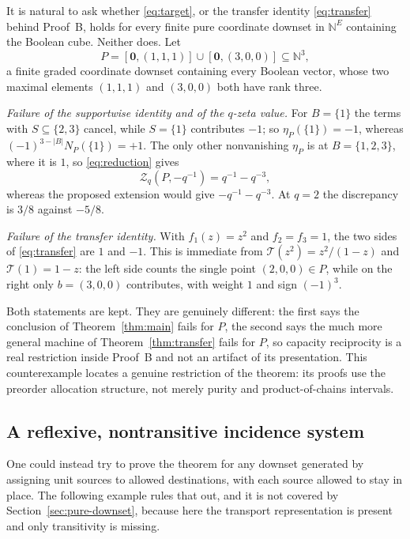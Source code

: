 \documentclass[11pt]{article}
\numberwithin{equation}{section}
\theoremstyle{definition}
\theoremstyle{remark}
\newcommand{\N}{\mathbb N}
\newcommand{\zero}{\mathbf 0}
\newcommand{\Tr}{\mathcal T}
\newcommand{\Zeta}{\mathcal Z}
\begin{document}
It is natural to ask whether \eqref{eq:target}, or the transfer identity
\eqref{eq:transfer} behind Proof~B, holds for every finite pure coordinate
downset in $\N^E$ containing the Boolean cube. Neither does. Let
\begin{equation}
 P=[\zero,(1,1,1)]\cup[\zero,(3,0,0)]\subseteq\N^3,
 \label{eq:counterexample}
\end{equation}
a finite graded coordinate downset containing every Boolean vector, whose two
maximal elements $(1,1,1)$ and $(3,0,0)$ both have rank three.

\smallskip\noindent\emph{Failure of the supportwise identity and of the
$q$-zeta value.} For $B=\{1\}$ the terms with $S\subseteq\{2,3\}$ cancel,
while $S=\{1\}$ contributes $-1$; so $\eta_P(\{1\})=-1$, whereas
$(-1)^{3-|B|}N_P(\{1\})=+1$. The only other nonvanishing $\eta_P$ is at
$B=\{1,2,3\}$, where it is $1$, so \eqref{eq:reduction} gives
\[
 \Zeta_q(P,-q^{-1})=q^{-1}-q^{-3},
\]
whereas the proposed extension would give $-q^{-1}-q^{-3}$. At $q=2$ the
discrepancy is $3/8$ against $-5/8$.

\smallskip\noindent\emph{Failure of the transfer identity.} With
$f_1(z)=z^2$ and $f_2=f_3=1$, the two sides of \eqref{eq:transfer} are $1$ and
$-1$. This is immediate from $\Tr(z^2)=z^2/(1-z)$ and $\Tr(1)=1-z$: the left
side counts the single point $(2,0,0)\in P$, while on the right only
$b=(3,0,0)$ contributes, with weight $1$ and sign $(-1)^3$.

Both statements are kept. They are genuinely different: the first says the
conclusion of Theorem~\ref{thm:main} fails for $P$, the second says the
much more general machine of Theorem~\ref{thm:transfer} fails for $P$, so
capacity reciprocity is a real restriction inside Proof~B and not an artifact
of its presentation. This counterexample locates a genuine restriction of the
theorem: its proofs use the preorder allocation structure, not merely purity
and product-of-chains intervals.

\subsection{A reflexive, nontransitive incidence system}
\label{sec:nontransitive}

One could instead try to prove the theorem for any downset generated by
assigning unit sources to allowed destinations, with each source allowed to
stay in place. The following example rules that out, and it is not covered by
Section~\ref{sec:pure-downset}, because here the transport representation is
present and only transitivity is missing.
\end{document}
